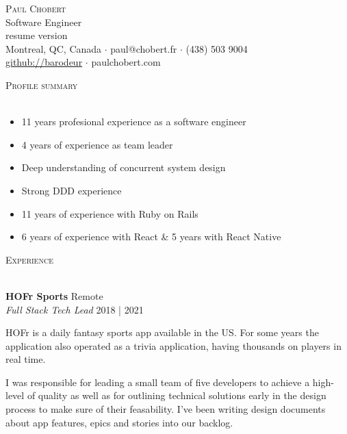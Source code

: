 \documentclass[a4paper]{article}
\newcommand{\hrefgithub} [1] {
    \href{https://github.com/#1}{github://#1}
}
\newcommand{\lineunder} {
    \vspace*{-8pt} \\
    \hspace*{-18pt} \hrulefill \\
}
\newcommand{\header} [1] {
    {\hspace*{-18pt}\vspace*{6pt} \textsc{#1}}
    \vspace*{-6pt} \lineunder
}
\begin{document}
\vspace*{-40pt}

\vspace*{-10pt}
\begin{center}
    {\Huge \scshape {Paul Chobert}}\\
    Software Engineer\\
    \ifx\empty\gitsha
    \else
        {\small resume version \href{https://github.com/barodeur/resume/tree/\gitsha}{}}\\
    \fi
    Montreal, QC, Canada $\cdot$ paul@chobert.fr $\cdot$ (438) 503 9004\\
    \hrefgithub{barodeur} $\cdot$ paulchobert.com
\end{center}

\vspace*{2mm}

\header{Profile summary}
\vspace{1mm}

\vspace{-1mm}
\begin{itemize} \itemsep 1pt
    \item 11 years profesional experience as a software engineer
    \item 4 years of experience as team leader
    \item Deep understanding of concurrent system design
    \item Strong DDD experience
    \item 11 years of experience with Ruby on Rails
    \item 6 years of experience with React \& 5 years with React Native
\end{itemize}
\vspace{-1mm}

\header{Experience}
\vspace{1mm}

\textbf{HOFr Sports} \hfill Remote\\
\textit{Full Stack Tech Lead} \hfill 2018 | 2021\\
\vspace{2mm}

HOFr is a daily fantasy sports app available in the US. For some years the application also operated as
a trivia application, having thousands on players in real time.

I was responsible for leading a small team of five developers to achieve a high-level of quality as well as
for outlining technical solutions early in the design process to make sure of their feasability.
I've been writing design documents about app features, epics and stories into our backlog.
\end{document}
